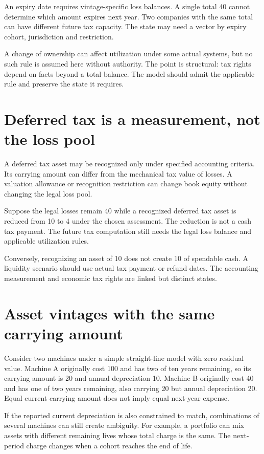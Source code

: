 An expiry date requires vintage-specific loss balances. A single total 40 cannot determine which amount expires next year. Two companies with the same total can have different future tax capacity. The state may need a vector by expiry cohort, jurisdiction and restriction.

A change of ownership can affect utilization under some actual systems, but no such rule is assumed here without authority. The point is structural: tax rights depend on facts beyond a total balance. The model should admit the applicable rule and preserve the state it requires.

\section{Deferred tax is a measurement, not the loss pool}
A deferred tax asset may be recognized only under specified accounting criteria. Its carrying amount can differ from the mechanical tax value of losses. A valuation allowance or recognition restriction can change book equity without changing the legal loss pool.

Suppose the legal losses remain 40 while a recognized deferred tax asset is reduced from 10 to 4 under the chosen assessment. The reduction is not a cash tax payment. The future tax computation still needs the legal loss balance and applicable utilization rules.

Conversely, recognizing an asset of 10 does not create 10 of spendable cash. A liquidity scenario should use actual tax payment or refund dates. The accounting measurement and economic tax rights are linked but distinct states.

\section{Asset vintages with the same carrying amount}
Consider two machines under a simple straight-line model with zero residual value. Machine A originally cost 100 and has two of ten years remaining, so its carrying amount is 20 and annual depreciation 10. Machine B originally cost 40 and has one of two years remaining, also carrying 20 but annual depreciation 20. Equal current carrying amount does not imply equal next-year expense.

If the reported current depreciation is also constrained to match, combinations of several machines can still create ambiguity. For example, a portfolio can mix assets with different remaining lives whose total charge is the same. The next-period charge changes when a cohort reaches the end of life.


